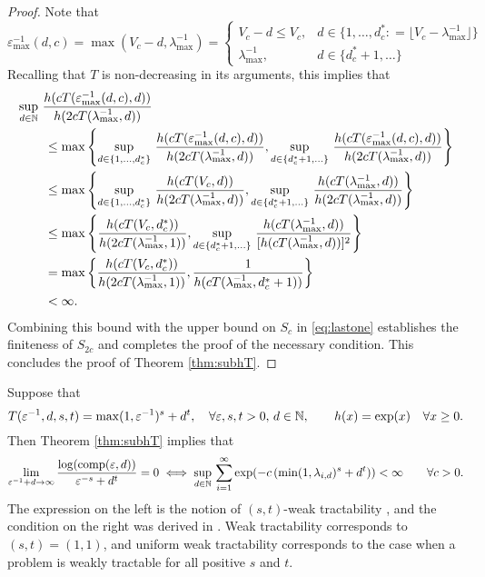 \documentclass[11pt,a4paper]{article}
\begin{document}
\begin{proof}
Note that
\[
\varepsilon^{-1}_{\max}(d,c) = \max(V_c - d,\lambda_{\max}^{-1})
= \begin{cases} V_c - d \le V_c, & d \in \{1, \ldots, d^*_c : = \lfloor V_c - \lambda_{\max}^{-1} \rfloor\} \\
\lambda_{\max}^{-1}, & d \in \{d^*_c+1, \ldots\}
\end{cases}
\]
Recalling that $T$ is non-decreasing in its arguments, this implies that
\begin{align*}
    \MoveEqLeft{\sup_{d\in\naturals} \,
		 \frac{ h(cT(\varepsilon^{-1}_{\max}(d,c),d))}{h(2cT(\lambda_{\max}^{-1},d))}}\\
  &\le \max \left \{
  \sup_{d \in \{1, \ldots, d^*_c\}} \,
		 \frac{ h(cT(\varepsilon^{-1}_{\max}(d,c),d))}{h(2cT(\lambda_{\max}^{-1},d))},
  \sup_{d\in \{d^*_c+1, \ldots \}} \,
		 \frac{ h(cT(\varepsilon^{-1}_{\max}(d,c),d))}{h(2cT(\lambda_{\max}^{-1},d))}
  \right \} \\
  & \le \max \left \{
  \sup_{d \in \{1, \ldots, d^*_c\}}  \,
		 \frac{ h(cT(V_c,d))}{h(2cT(\lambda_{\max}^{-1},d))}
  ,
  \sup_{d\in \{d^*_c+1, \ldots \}}  \,
		 \frac{ h(cT(\lambda_{\max}^{-1},d))}{h(2cT(\lambda_{\max}^{-1},d))}
  \right \}
  \\
  & \le \max \left \{
		 \frac{ h(cT(V_c,d^*_c))}{h(2cT(\lambda_{\max}^{-1},1))},
  \sup_{d\in \{d^*_c+1, \ldots \}}  \,
		 \frac{ h(cT(\lambda_{\max}^{-1},d))}{[h(cT(\lambda_{\max}^{-1},d))]^2}
  \right \} \\
  & = \max \left \{
		 \frac{ h(cT(V_c,d^*_c))}{h(2cT(\lambda_{\max}^{-1},1))},
		 \frac{1}{h(cT(\lambda_{\max}^{-1},d_c^*+1))}
  \right \} \\
  & < \infty.
\end{align*}
Combining this bound with the upper bound on $S_c$ in \eqref{eq:lastone} establishes the finiteness of $S_{2c}$ and completes the proof of the necessary condition.
This concludes the proof of Theorem \ref{thm:subhT}.
\end{proof}




\begin{example}
	Suppose that
	\[
	T(\varepsilon^{-1},d,s,t) = \max(1,\varepsilon^{-1})^s + d^t, \quad \forall \varepsilon,s,t > 0, \, d \in \mathbb{N}, \qquad h(x) = \exp(x) \quad \forall x \ge 0.
	\]
	Then Theorem \ref{thm:subhT} implies that
	\[\lim_{\varepsilon^{-1}+d\rightarrow \infty} \frac{\log( \operatorname{comp}(\varepsilon,d))}{\varepsilon^{-s}+d^t} = 0
	\iff
	 \sup_{d\in\mathbb{N}}  \, \sum_{i=1}^\infty \exp(-c\, (\min(1,\lambda_{i,d})^{s} + d^t )) <\infty \qquad \forall c > 0.
	\]
	The expression on the left is the notion of $(s,t)$-weak tractability \cite{??}, and the condition on the right was derived in \cite{??}.  Weak tractability corresponds to $(s,t)=(1,1)$, and uniform weak tractability corresponds to the case when a problem is weakly tractable for all positive $s$ and $t$.
\end{example}
\end{document}
